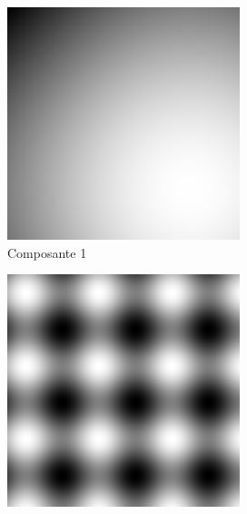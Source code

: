 \begin{figure}
\centering
\begin{subfigure}{.30\textwidth}
  \centering
  \includegraphics[width=.9\linewidth]{img/s_0}
  \caption{Composante 1}
\end{subfigure}
\begin{subfigure}{.30\textwidth}
  \centering
  \includegraphics[width=.9\linewidth]{img/s_1}

\end{subfigure}
\end{figure}
